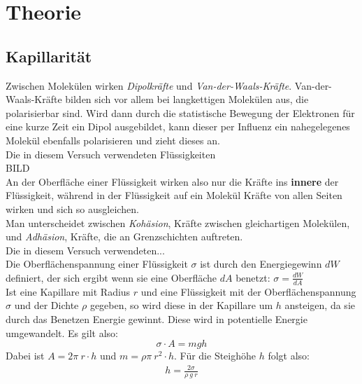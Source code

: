 \documentclass[12pt,a4paper,titlepage,headinclude,bibtotoc]{scrartcl}
\begin{document}
\section{Theorie}
\label{sec:theorie}
\subsection{Kapillarität}
Zwischen Molekülen wirken \textit{Dipolkräfte} und \textit{Van-der-Waals-Kräfte}.
Van-der-Waals-Kräfte bilden sich vor allem bei langkettigen Molekülen aus, die polarisierbar sind.
Wird dann durch die statistische Bewegung der Elektronen für eine kurze Zeit ein Dipol ausgebildet, kann dieser per Influenz ein nahegelegenes Molekül ebenfalls polarisieren und zieht dieses an.\\
Die in diesem Versuch verwendeten Flüssigkeiten\\
BILD\\
An der Oberfläche einer Flüssigkeit wirken also nur die Kräfte ins \textbf{innere} der Flüssigkeit, während in der Flüssigkeit auf ein Molekül Kräfte von allen Seiten wirken und sich so ausgleichen.\\
Man unterscheidet zwischen \textit{Kohäsion}, Kräfte zwischen gleichartigen Molekülen, und \textit{Adhäsion}, Kräfte, die an Grenzschichten auftreten.\\
Die in diesem Versuch verwendeten...\\

Die Oberflächenspannung einer Flüssigkeit $\sigma$ ist durch den Energiegewinn $dW$ definiert, der sich ergibt wenn sie eine Oberfläche $dA$ benetzt: $ \sigma=\frac{dW}{dA}$\\
Ist eine Kapillare mit Radius $r$ und eine Flüssigkeit mit der Oberflächenspannung $\sigma$ und der Dichte $\rho$ gegeben, so wird diese in der Kapillare um $h$ ansteigen, da sie durch das Benetzen Energie gewinnt.
Diese wird in potentielle Energie umgewandelt.
Es gilt also:
$$ \sigma\cdot A=mgh$$
Dabei ist $A=2\pi~r \cdot h$ und $m=\rho \pi ~ r^2 \cdot h$.
Für die Steighöhe $h$ folgt also:
\begin{align}
	h = \frac{2\sigma}{\rho~g~r}
\end{align}
\end{document}
